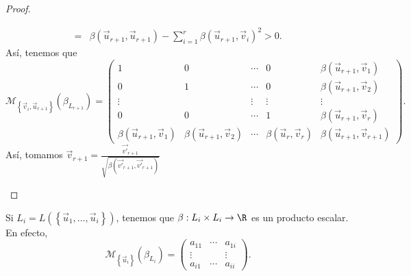 \begin{proof}
\begin{description}
\[\begin{split}
	= & \beta\left(\vec{u}_{r+1}, \vec{u}_{r+1}\right) - \sum^{r}_{i=1}\beta\left(\vec{u}_{r+1}, \vec{v}_{i}\right)^{2} > 0.
\end{split}
\]
Así, tenemos que 
\[\mathcal{M}_{ \left\{ \vec{v}_{i}, \vec{u}_{r+1}\right\} }\left(\beta_{L_{r+1}}\right) = \begin{pmatrix} 1 & 0 & \cdots & 0 & \beta\left(\vec{u}_{r+1}, \vec{v}_{1}\right) \\
0 & 1 & \cdots & 0 & \beta\left(\vec{u}_{r+1}, \vec{v}_{2}\right) \\
\vdots & & \vdots & \vdots & \vdots \\
0 & 0 & \cdots & 1 & \beta\left(\vec{u}_{r+1}, \vec{v}_{r}\right) \\
\beta\left(\vec{u}_{r+1}, \vec{v}_{1}\right) & \beta\left(\vec{u}_{r+1}, \vec{v}_{2}\right) & \cdots & \beta\left(\vec{u}_{r}, \vec{v}_{r}\right) & \beta\left(\vec{u}_{r+1}, \vec{v}_{r+1}\right)\end{pmatrix} .\]
Así, tomamos $\displaystyle \vec{v}_{r+1} = \frac{\vec{v'}_{r+1}}{\sqrt{\beta\left(\vec{v'}_{r+1}, \vec{v'}_{r+1}\right)}} $ 
\end{description}
\end{proof}
\begin{observation}
\normalfont Si $\displaystyle L_{i} = L\left( \left\{ \vec{u}_{1}, \ldots, \vec{u}_{i}\right\} \right) $, tenemos que $\displaystyle \beta:L_{i} \times L_{i} \to \R $ es un producto escalar. En efecto,
\[\mathcal{M}_{ \left\{ \vec{u}_{i}\right\} }\left(\beta_{L_{i}}\right) = \begin{pmatrix} a_{11} & \cdots & a_{1i} \\
\vdots & & \vdots \\
a_{i1} & \cdots & a_{ii}\end{pmatrix} .\]
\end{observation}


